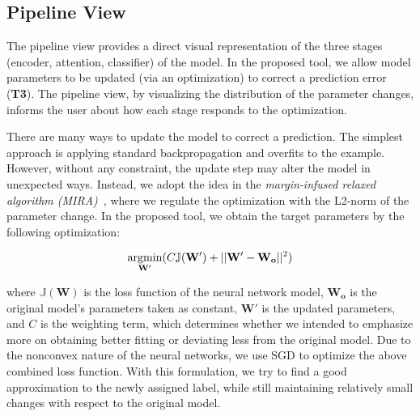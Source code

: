 \subsection{Pipeline View}
\label{sec:pipeline}
The pipeline view provides a direct visual representation of the three stages (encoder, attention, classifier) of the model. In the proposed tool, we allow model parameters to be updated (via an optimization) to correct a prediction error (\textbf{T3}). The pipeline view, by visualizing the distribution of the parameter changes, informs the user about how each stage responds to the optimization.

There are many ways to update the model to correct a prediction. The simplest approach is applying standard backpropagation and overfits to the example. However, without any constraint, the update step may alter the model in unexpected ways.
Instead, we adopt the idea in the \emph{margin-infused relaxed algorithm (MIRA)}~\cite{CrammerSinger2003}, where we regulate the optimization with the L2-norm of the parameter change. In the proposed tool, we obtain the target parameters by the following optimization:

\begin{equation}
\vspace{-1mm}
\underset{\mathbf{W}'}{\mathrm{argmin}}( C \mathbb{J}(\mathbf{W}') + ||\mathbf{W}' - \mathbf{W_o}||^2)
\end{equation}

where $\mathbb{J}(\mathbf{W})$ is the loss function of the neural network model, $\mathbf{W_o}$ is the original model's parameters taken as constant, $\mathbf{W}'$ is the updated parameters, and $C$ is the weighting term, which determines whether we intended to emphasize more on obtaining better fitting or deviating less from the original model. Due to the nonconvex nature of the neural networks, we use SGD to optimize the above combined loss function.
%
With this formulation, we try to find a good approximation to the newly assigned label, while still maintaining relatively small changes with respect to the original model.

